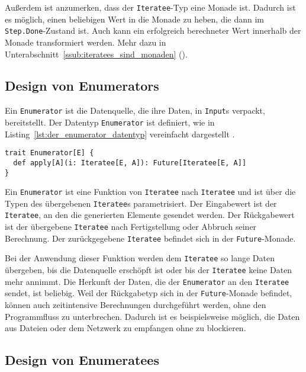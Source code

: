 Außerdem ist anzumerken, dass der \lstinline|Iteratee|-Typ eine Monade ist.
Dadurch ist es möglich, einen beliebigen Wert in die Monade zu heben, die dann im \lstinline|Step.Done|-Zustand ist.
Auch kann ein erfolgreich berechneter Wert innerhalb der Monade transformiert werden.
Mehr dazu in Unterabschnitt~\ref{ssub:iteratees_sind_monaden} ().



\subsection{Design von Enumerators} %
\label{sub:design_enumerators}

Ein \lstinline|Enumerator| ist die Datenquelle, die ihre Daten, in \lstinline|Input|s verpackt, bereitstellt.
Der Datentyp \lstinline|Enumerator| ist definiert, wie in Listing~\ref{lst:der_enumerator_datentyp} vereinfacht dargestellt \cite[vgl.][]{play_enumerator_source_code}.
\begin{lstlisting}[caption=Der Enumerator-Datentyp, label=lst:der_enumerator_datentyp]
trait Enumerator[E] {
  def apply[A](i: Iteratee[E, A]): Future[Iteratee[E, A]]
}
\end{lstlisting}

Ein \lstinline|Enumerator| ist eine Funktion von \lstinline|Iteratee| nach \lstinline|Iteratee| und ist über die Typen des übergebenen \lstinline|Iteratee|s parametrisiert.
Der Eingabewert ist der \lstinline|Iteratee|, an den die generierten Elemente gesendet werden.
Der Rückgabewert ist der übergebene \lstinline|Iteratee| nach Fertigstellung oder Abbruch seiner Berechnung.
Der zurückgegebene \lstinline|Iteratee| befindet sich in der \lstinline|Future|-Monade.

Bei der Anwendung dieser Funktion werden dem \lstinline|Iteratee| so lange Daten übergeben, bis die Datenquelle erschöpft ist oder bis der \lstinline|Iteratee| keine Daten mehr annimmt.
Die Herkunft der Daten, die der \lstinline|Enumerator| an den \lstinline|Iteratee| sendet, ist beliebig.
Weil der Rückgabetyp sich in der \lstinline|Future|-Monade befindet, können auch zeitintensive Berechnungen durchgeführt werden, ohne den Programmfluss zu unterbrechen.
Dadurch ist es beispielsweise möglich, die Daten aus Dateien oder dem Netzwerk zu empfangen ohne zu blockieren.



\subsection{Design von Enumeratees} %
\label{sub:design_enumeratees}

